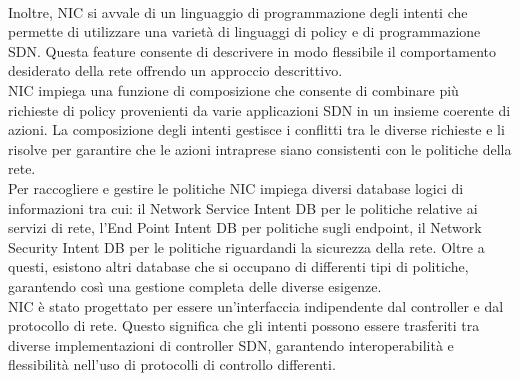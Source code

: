 \\Inoltre, NIC si avvale di un linguaggio di programmazione degli intenti che permette di utilizzare una varietà di linguaggi di policy e di programmazione SDN.
Questa feature consente di descrivere in modo flessibile il comportamento desiderato della rete offrendo un approccio descrittivo.
\\NIC impiega una funzione di composizione che consente di combinare più richieste di policy provenienti da varie applicazioni SDN in un insieme coerente di azioni.
La composizione degli intenti gestisce i conflitti tra le diverse richieste e li risolve per garantire che le azioni intraprese siano consistenti con le politiche della rete.
\\Per raccogliere e gestire le politiche NIC impiega diversi database logici di informazioni tra cui: il Network Service Intent DB per le politiche relative ai servizi di rete,
l'End Point Intent DB per politiche sugli endpoint, il Network Security Intent DB per le politiche riguardandi la sicurezza della rete\cite{NICProposal}.
Oltre a questi, esistono altri database che si occupano di differenti tipi di politiche, garantendo così una gestione completa delle diverse esigenze.
\\NIC è stato progettato per essere un'interfaccia indipendente dal controller e dal protocollo di rete.
Questo significa che gli intenti possono essere trasferiti tra diverse implementazioni di controller SDN, garantendo interoperabilità e flessibilità nell'uso di protocolli di controllo differenti.



